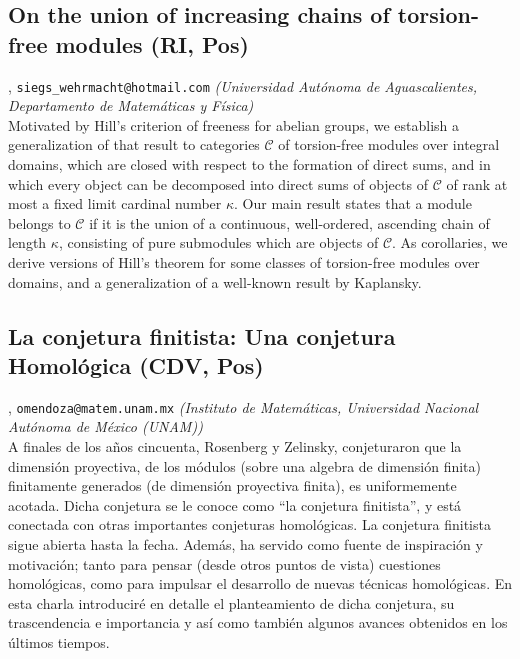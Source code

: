 \subsection{\sffamily On the union of increasing chains of torsion-free modules {\footnotesize (RI, Pos)}} \label{reg-247} 
, {\tt siegs\_wehrmacht@hotmail.com}  {\slshape (Universidad Aut\'onoma de Aguascalientes, Departamento de Matem\'aticas y F\'isica)}\\
          \noindent Motivated by Hill's criterion of freeness for abelian groups, we establish a generalization of that result to categories $\mathcal {C}$ of torsion-free modules over integral domains, which are closed with respect to the formation of direct sums, and in which every object can be decomposed into direct sums of objects of $\mathcal {C}$ of rank at most a fixed limit cardinal number $\kappa$. Our main result states that a module belongs to $\mathcal {C}$ if it is the union of a continuous, well-ordered, ascending chain of length $\kappa$, consisting of pure submodules which are objects of $\mathcal {C}$. As corollaries, we derive versions of Hill's theorem for some classes of torsion-free modules over domains, and a generalization of a well-known result by Kaplansky.
\subsection{\sffamily La conjetura finitista: Una conjetura Homol\'ogica {\footnotesize (CDV, Pos)}} \label{reg-591} 
, {\tt omendoza@matem.unam.mx}  {\slshape (Instituto de Matem\'aticas, Universidad Nacional Aut\'onoma de M\'exico (UNAM))}\\
          \noindent A finales de los a\~nos cincuenta, Rosenberg y Zelinsky, conjeturaron que la dimensi\'on proyectiva, de los m\'odulos (sobre una algebra de dimensi\'on finita) finitamente generados (de dimensi\'on proyectiva finita), es uniformemente acotada. Dicha conjetura se le conoce como ``la conjetura finitista'', y est\'a conectada con otras importantes conjeturas homol\'ogicas. La conjetura finitista sigue abierta hasta la fecha. Adem\'as, ha servido como fuente de inspiraci\'on y motivaci\'on; tanto para pensar (desde otros puntos de vista) cuestiones homol\'ogicas, como para impulsar el desarrollo de nuevas t\'ecnicas homol\'ogicas. En  esta charla introducir\'e en detalle el planteamiento de dicha conjetura, su trascendencia e importancia y as\'i como tambi\'en algunos avances obtenidos en los \'ultimos tiempos.
